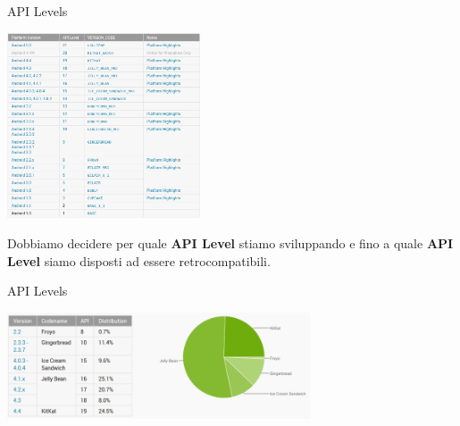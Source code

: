 \documentclass[xcolor=svgnames,11pt]{beamer}
\begin{document}
\begin{frame}{API Levels}

\medskip

\begin{center}

\includegraphics[height=5.5cm]{apilevel.png}

\end{center}

\pause
\medskip

Dobbiamo decidere per quale \textbf{API Level} stiamo sviluppando e fino a quale \textbf{API Level} siamo disposti ad essere retrocompatibili.

\end{frame}

\begin{frame}{API Levels}

\begin{center}
\includegraphics[width=9cm]{dashboard.png}
\end{center}
\end{frame}
\end{document}
